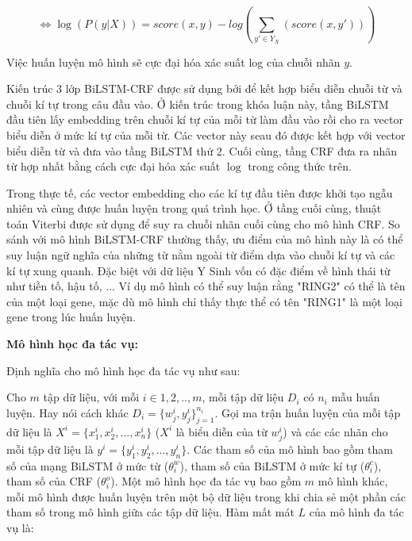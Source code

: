 \documentclass[../main.tex]{subfiles}
\begin{document}
\begin{itemize}
\begin{equation}
\Leftrightarrow \log(P(y|X)) = score(x, y) - log(\sum_{y' \in Y_{X}}(score(x, y'))) \tag{1}
\end{equation}


Việc huấn luyện mô hình sẽ cực đại hóa xác suất log của chuỗi nhãn $y$. 

Kiến trúc 3 lớp BiLSTM-CRF được sử dụng bởi \cite{lample2016neural} để kết hợp biểu diễn chuỗi từ và chuỗi kí tự trong câu đầu vào. Ở kiến trúc trong khóa luận này, tầng BiLSTM đầu tiên lấy embedding trên chuỗi kí tự của mỗi từ làm đầu vào rồi cho ra vector biểu diễn ở mức kí tự của mỗi từ. Các vector này seau đó được kết hợp với vector biểu diễn từ và đưa vào tầng BiLSTM thứ 2. Cuối cùng, tầng CRF đưa ra nhãn từ hợp nhất bằng cách cực đại hóa xác suất $\log$ trong công thức trên. 

Trong thực tế, các vector embedding cho các kí tự đầu tiên được khởi tạo ngẫu nhiên và cùng được huấn luyện trong quá trình học. Ở tầng cuối cùng, thuật toán Viterbi được sử dụng để suy ra chuỗi nhãn cuối cùng cho mô hình CRF. So sánh với mô hình BiLSTM-CRF thường thấy, ưu điểm của mô hình này là có thể suy luận ngữ nghĩa của những từ nằm ngoài từ điểm dựa vào chuỗi kí tự và các kí tự xung quanh. Đặc biệt với dữ liệu Y Sinh vốn có đặc điểm về hình thái từ như tiền tố, hậu tố, ... Ví dụ mô hình có thể suy luận rằng "RING2" có thể là tên của một loại gene, mặc dù mô hình chỉ thấy thực thể có tên "RING1" là một loại gene trong lúc huấn luyện. 

\end{itemize}

\textbf{Mô hình học đa tác vụ: }

Định nghĩa cho mô hình học đa tác vụ như sau: 

Cho $m$ tập dữ liệu, với mỗi $i \in {1, 2, .., m}$, mỗi tập dữ liệu $D_{i}$ có $n_{i}$ mẫu huấn luyện. Hay nói cách khác $D_{i} = \{w^{i}_{j}, y^{i}_{j}\}^{n_{i}}_{j=1}$. Gọi ma trận huấn luyện của mỗi tập dữ liệu là $X^{i} = \{x^{i}_{1}, x^{i}_{2}, ..., x^{i}_{n}\}$ ($X^{i}$ là biểu diễn của từ $w^{i}_{j}$) và các các nhãn cho mỗi tập dữ liệu là $y^{i} = \{y^{i}_{1}, y^{i}_{2}, ..., y^{i}_{n}\}$. Các tham số của mô hình bao gồm tham số của mạng BiLSTM ở mức từ ($\theta^{w}_{i}$), tham số của BiLSTM ở mức kí tự ($\theta^{c}_{i}$), tham số của CRF ($\theta^{o}_{i}$). Một mô hình học đa tác vụ bao gồm $m$ mô hình khác, mỗi mô hình được huấn luyện trên một bộ dữ liệu trong khi chia sẻ một phần các tham số trong mô hình giữa các tập dữ liệu. Hàm mất mát $L$ của mô hình đa tác vụ là: 
\end{document}
